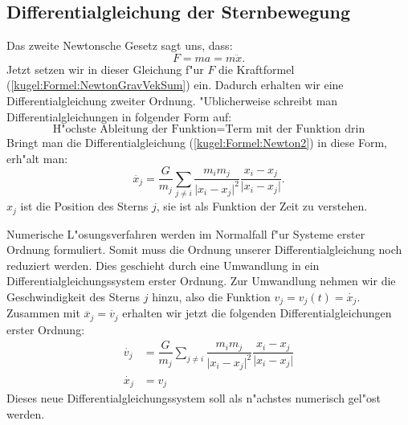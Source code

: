 \begin{refsection}
\subsection{Differentialgleichung der Sternbewegung}
Das zweite Newtonsche Gesetz sagt uns, dass:	
\begin{equation}
	 F = m  a = m \ddot{x}.
	\label{kugel:Formel:Newton2}
\end{equation}
Jetzt setzen wir in dieser Gleichung f"ur $F$ die Kraftformel
(\ref{kugel:Formel:NewtonGravVekSum}) ein. Dadurch erhalten wir eine
Differentialgleichung zweiter Ordnung. "Ublicherweise schreibt man
Differentialgleichungen in folgender Form auf:
\[
\text{H"ochste Ableitung der Funktion} = \text{Term mit der Funktion drin}
\]
Bringt man die Differentialgleichung (\ref{kugel:Formel:Newton2}) in
diese Form, erh"alt man:
\begin{equation}
\ddot{{x_j}} = \dfrac{G}{m_j} \sum_{j \neq i} \dfrac{m_i m_j}{\lvert  x_i -  x_j \lvert^2} \dfrac{x_i -  x_j}{\lvert x_i -  x_j \lvert}.
\label{kugel:Formel:DGLo2}
\end{equation}
$x_j$ ist die Position des Sterns $j$, sie ist als Funktion der Zeit
zu verstehen.
	
Numerische L"osungsverfahren werden im Normalfall f"ur Systeme erster
Ordnung formuliert.
Somit muss die Ordnung unserer Differentialgleichung noch reduziert
werden.
Dies geschieht durch eine Umwandlung in ein Differentialgleichungssystem
erster Ordnung.
Zur Umwandlung nehmen wir die Geschwindigkeit des Sterns $j$ hinzu,
also die Funktion $v_j = v_j(t) = \dot{x_j}$.
Zusammen mit $\ddot{x_j} = \dot{v_j}$ erhalten wir jetzt die folgenden
Differentialgleichungen erster Ordnung:
\begin{equation}
\begin{aligned}
	\dot{v_j} &= \dfrac{G}{m_j} \sum_{j \neq i} \dfrac{m_i m_j}{\lvert x_i - x_j \lvert^2} \dfrac{x_i - x_j}{\lvert x_i - x_j \lvert} \\
	\dot{x_j} &= v_j
\end{aligned}
\label{kugel:Formel:DGLSys}
\end{equation}
Dieses neue Differentialgleichungssystem soll als n"achstes numerisch
gel"ost werden.
	

\end{refsection}
